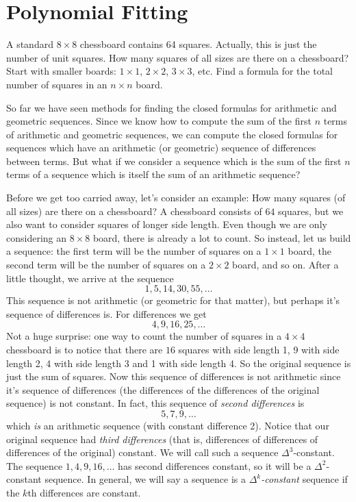 \documentclass[12pt]{article}
\begin{document}
\section{Polynomial Fitting}\label{sec:polyfit}

\begin{activity}
A standard $8 \times 8$ chessboard contains 64 squares.  Actually, this is just the number of unit squares.  How many squares of all sizes are there on a chessboard?  Start with smaller boards: $1\times 1$, $2 \times 2$, $3\times 3$, etc.  Find a formula for the total number of squares in an $n\times n$ board.
\end{activity}

So far we have seen methods for finding the closed formulas for arithmetic and geometric sequences.  Since we know how to compute the sum of the first $n$ terms of arithmetic and geometric sequences, we can compute the closed formulas for sequences which have an arithmetic (or geometric) sequence of differences between terms.  But what if we consider a sequence which is the sum of the first $n$ terms of a sequence which is itself the sum of an arithmetic sequence?

Before we get too carried away, let's consider an example: How many squares (of all sizes) are there on a chessboard?  A chessboard consists of $64$ squares, but we also want to consider squares of longer side length.  Even though we are only considering an $8 \times 8$ board, there is already a lot to count.  So instead, let us build a sequence: the first term will be the number of squares on a $1 \times 1$ board, the second term will be the number of squares on a $2 \times 2$ board, and so on.  After a little thought, we arrive at the sequence
\[1,5,14,30, 55,\ldots\]
This sequence is not arithmetic (or geometric for that matter), but perhaps it's sequence of differences is.  For differences we get
\[4, 9, 16, 25, \ldots\]
Not a huge surprise: one way to count the number of squares in a $4 \times 4$ chessboard is to notice that there are $16$ squares with side length 1, 9 with side length 2, 4 with side length 3 and 1 with side length 4.  So the original sequence is just the sum of squares.  Now this sequence of differences is not arithmetic since it's sequence of differences (the differences of the differences of the original sequence) is not constant.  In fact, this sequence of {\em second differences} is
\[5, 7, 9, \ldots\]
which {\em is} an arithmetic sequence (with constant difference 2).  Notice that our original sequence had {\em third differences} (that is, differences of differences of differences of the original) constant.  We will call such a sequence $\Delta^3$-constant.  The sequence $1, 4, 9, 16, \ldots$ has second differences constant, so it will be a $\Delta^2$-constant sequence. In general, we will say a sequence is a \emph{$\Delta^k$-constant} sequence if the $k$th differences are constant.
\end{document}

